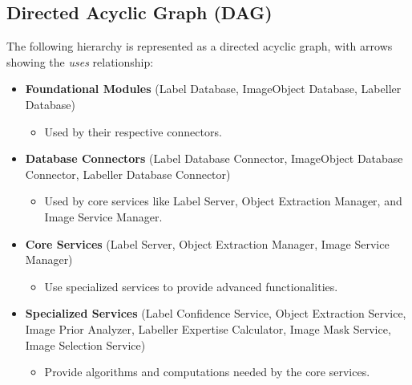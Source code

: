 \documentclass[12pt, titlepage]{article}
\begin{document}
\subsection*{Directed Acyclic Graph (DAG)}

The following hierarchy is represented as a directed acyclic graph, with arrows showing the \textit{uses} relationship:

\begin{itemize}
    \item \textbf{Foundational Modules} (Label Database, ImageObject Database, Labeller Database)
    \begin{itemize}
        \item Used by their respective connectors.
    \end{itemize}
    \item \textbf{Database Connectors} (Label Database Connector, ImageObject Database Connector, Labeller Database Connector)
    \begin{itemize}
        \item Used by core services like Label Server, Object Extraction Manager, and Image Service Manager.
    \end{itemize}
    \item \textbf{Core Services} (Label Server, Object Extraction Manager, Image Service Manager)
    \begin{itemize}
        \item Use specialized services to provide advanced functionalities.
    \end{itemize}
    \item \textbf{Specialized Services} (Label Confidence Service, Object Extraction Service, Image Prior Analyzer, Labeller Expertise Calculator, Image Mask Service, Image Selection Service)
    \begin{itemize}
        \item Provide algorithms and computations needed by the core services.
    \end{itemize}
\end{itemize}
\end{document}
